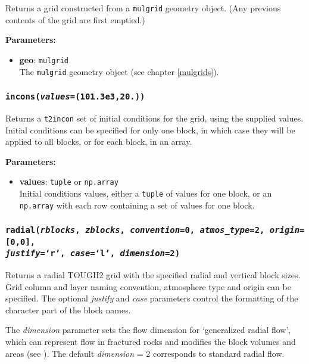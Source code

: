 Returns a grid constructed from a \texttt{mulgrid} geometry object.  (Any previous contents of the grid are first emptied.)

\textbf{Parameters:}
\begin{itemize}
\item \textbf{geo}: \texttt{mulgrid}\\
  The \texttt{mulgrid} geometry object (see chapter \ref{mulgrids}).
\end{itemize}

\begin{snugshade}
\subsubsection{\texttt{incons(\emph{values}=(101.3e3,20.))}}
\end{snugshade}
\label{sec:t2grid:incons}

Returns a \texttt{t2incon} set of initial conditions for the grid, using the supplied values.  Initial conditions can be specified for only one block, in which case they will be applied to all blocks, or for each block, in an array.

\textbf{Parameters:}
\begin{itemize}
\item \textbf{values}: \texttt{tuple} or \texttt{np.array}\\
  Initial conditions values, either a \texttt{tuple} of values for one block, or an \texttt{np.array} with each row containing a set of values for one block. 
\end{itemize}

\begin{snugshade}
\subsubsection{\texttt{radial(\emph{rblocks}, \emph{zblocks}, \emph{convention}=0, \emph{atmos\_type}=2, \emph{origin}=[0,0],\\
    \emph{justify}=`r', \emph{case}=`l', \emph{dimension}=2)}}
\end{snugshade}
\label{sec:t2grid:radial}

Returns a radial TOUGH2 grid with the specified radial and vertical block sizes.  Grid column and layer naming convention, atmosphere type and origin can be specified.  The optional \emph{justify} and \emph{case} parameters control the formatting of the character part of the block names.

The \emph{dimension} parameter sets the flow dimension for `generalized radial flow', which can represent flow in fractured rocks and modifies the block volumes and areas (see \cite{barker_1988}).  The default \emph{dimension} = 2 corresponds to standard radial flow.

